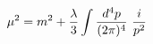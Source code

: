 \begin{equation}\label{ventotto}
\mu ^2=  m^2   + {\lambda \over 3} \int \frac{d^4 p}{(2\pi)^4} ~{{i} \over {p^2}}
\end{equation}

